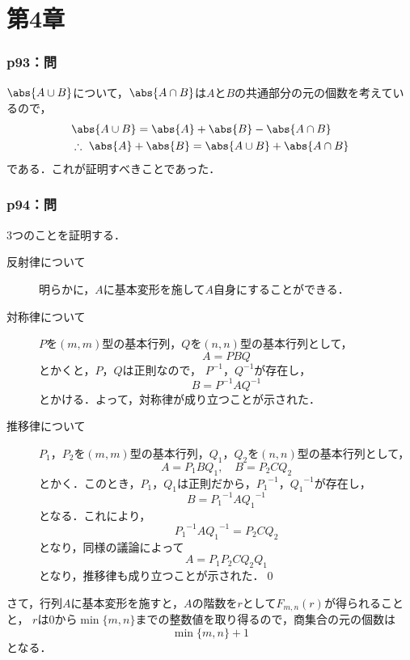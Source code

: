 \part*{第4章}



\section*{p93：問}

\begin{tproof}
  $\abs{A \cup B}$について，$ \abs{A \cap B}$は$A$と$B$の共通部分の元の個数を考えているので，
  \begin{align*}
     & \abs{A \cup B} = \abs{A}+\abs{B} - \abs{A \cap B}              \\
     & \therefore ~ \abs{A}+\abs{B} = \abs{A \cup B} + \abs{A \cap B}
  \end{align*}
  である．これが証明すべきことであった．
\end{tproof}




\section*{p94：問}

\begin{tanswer}
  3つのことを証明する．
  \begin{description}
    \item [反射律について] 明らかに，$A$に基本変形を施して$A$自身にすることができる．
    \item [対称律について] $P$を$(m,m)$型の基本行列，$Q$を$(n,n)$型の基本行列として，
          \[
            A = P B Q
          \]
          とかくと，$P$，$Q$は正則なので， $P^{-1}$，$Q^{-1}$が存在し，
          \[
            B= P^{-1} A Q^{-1}
          \]
          とかける．よって，対称律が成り立つことが示された．
    \item[推移律について] $P_1$，$P_2$を$(m,m)$型の基本行列，$Q_1$，$Q_2$を$(n,n)$型の基本行列として，
          \[
            A = P_1 B Q_1 , \quad B = P_2 C Q_2
          \]
          とかく．このとき，$P_1$，$Q_1$は正則だから，${P_1}^{-1}$，${Q_1}^{-1}$が存在し，
          \[
            B = {P_1}^{-1} A {Q_1}^{-1}
          \]
          となる．これにより，
          \[
            {P_1}^{-1} A {Q_1}^{-1} =P_2 C Q_2
          \]
          となり，同様の議論によって
          \[
            A = P_1 P_2 C Q_2 Q_1
          \]
          となり，推移律も成り立つことが示された．\qed
  \end{description}
  さて，行列$A$に基本変形を施すと，$A$の階数を$r$として$F_{m,n} (r)$が得られることと，
  $r$は$0$から$\min \{m,n\}$までの整数値を取り得るので，商集合の元の個数は
  \[
    \min \{ m , n \} +1
  \]
  となる．
\end{tanswer}





